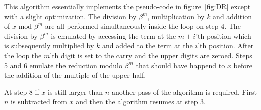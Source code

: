 \documentclass[b5paper]{book}
\begin{document}
This algorithm essentially implements the pseudo-code in figure~\ref{fig:DR} except with a slight optimization.  The division by $\beta^m$, multiplication by $k$
and addition of $x \mbox{ mod }\beta^m$ are all performed simultaneously inside the loop on step 4.  The division by $\beta^m$ is emulated by accessing
the term at the $m+i$'th position which is subsequently multiplied by $k$ and added to the term at the $i$'th position.  After the loop the $m$'th
digit is set to the carry and the upper digits are zeroed.  Steps 5 and 6 emulate the reduction modulo $\beta^m$ that should have happend to 
$x$ before the addition of the multiple of the upper half.  

At step 8 if $x$ is still larger than $n$ another pass of the algorithm is required.  First $n$ is subtracted from $x$ and then the algorithm resumes
at step 3.  
\end{document}
